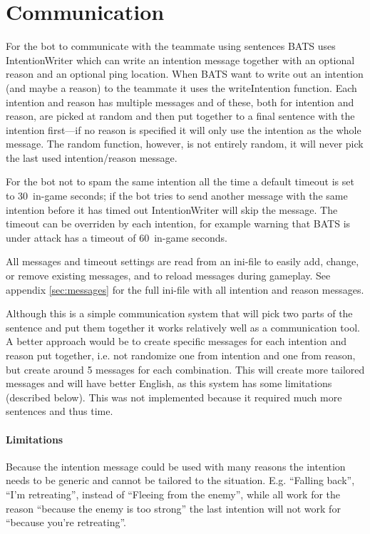 \section{Communication}
\label{sec:communication}
For the bot to communicate with the teammate using sentences BATS uses IntentionWriter which can write an intention message together with an optional reason and an optional ping location. When BATS want to write out an intention (and maybe a reason) to the teammate it uses the writeIntention function. Each intention and reason has multiple messages and of these, both for intention and reason, are picked at random and then put together to a final sentence with the intention first—if no reason is specified it will only use the intention as the whole message. The random function, however, is not entirely random, it will never pick the last used intention/reason message.

For the bot not to spam the same intention all the time a default timeout is set to 30\conf~in-game seconds; if the bot tries to send another message with the same intention before it has timed out IntentionWriter will skip the message. The timeout can be overriden by each intention, for example warning that BATS is under attack has a timeout of 60\conf~in-game seconds.

All messages and timeout settings are read from an ini-file to easily add, change, or remove existing messages, and to reload messages during gameplay. See appendix \ref{sec:messages} for the full ini-file with all intention and reason messages.

Although this is a simple communication system that will pick two parts of the sentence and put them together it works relatively well as a communication tool. A better approach would be to create specific messages for each intention and reason put together, i.e. not randomize one from intention and one from reason, but create around 5 messages for each combination. This will create more tailored messages and will have better English, as this system has some limitations (described below). This was not implemented because it required much more sentences and thus time.

\paragraph{Limitations}
Because the intention message could be used with many reasons the intention needs to be generic and cannot be tailored to the situation. E.g. ``Falling back'', ``I'm retreating'', instead of ``Fleeing from the enemy'', while all work for the reason ``because the enemy is too strong'' the last intention will not work for ``because you're retreating''.

